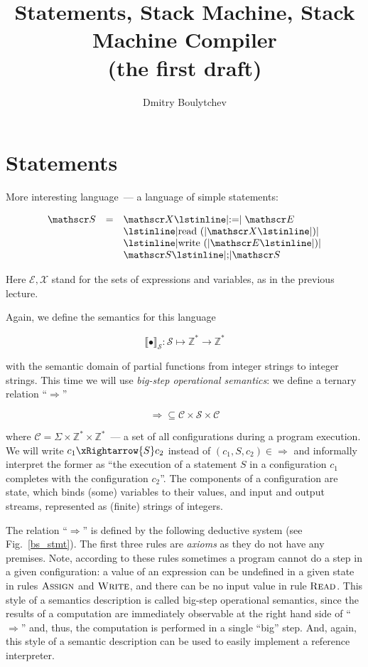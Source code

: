 \documentclass{article}
\title{Statements, Stack Machine, Stack Machine Compiler\\
  (the first draft)
}
\date{\vspace{-5ex}}
\author{Dmitry Boulytchev}
\newcommand{\rulename}[1]{\textsc{#1}}
\newcommand{\sembr}[1]{\llbracket{#1}\rrbracket}
\theoremstyle{definition}
\begin{document}
\maketitle

\section{Statements}

More interesting language~--- a language of simple statements:

$$
\begin{array}{rcl}  
  \mathscr S & = & \mathscr X \mbox{\lstinline|:=|} \;\mathscr E \\
             &   & \mbox{\lstinline|read (|} \mathscr X \mbox{\lstinline|)|} \\
             &   & \mbox{\lstinline|write (|} \mathscr E \mbox{\lstinline|)|} \\
             &   & \mathscr S \mbox{\lstinline|;|} \mathscr S
\end{array}
$$

Here $\mathscr E, \mathscr X$ stand for the sets of expressions and variables, as in the previous lecture.

Again, we define the semantics for this language 

$$
\sembr{\bullet}_{\mathscr S} : \mathscr S \mapsto \mathbb Z^* \to \mathbb Z^*
$$

with the semantic domain of partial functions from integer strings to integer strings. This time we will
use \emph{big-step operational semantics}: we define a ternary relation ``$\Rightarrow$''

$$
\Rightarrow \subseteq \mathscr C \times \mathscr S \times \mathscr C
$$

where $\mathscr C = \Sigma \times \mathbb Z^* \times \mathbb Z^*$~--- a set of all configurations during a
program execution. We will write $c_1\xRightarrow{S}c_2$ instead of $(c_1, S, c_2)\in\Rightarrow$ and informally
interpret the former as ``the execution of a statement $S$ in a configuration $c_1$ completes with the configuration
$c_2$''. The components of a configuration are state, which binds (some) variables to their values, and input and
output streams, represented as (finite) strings of integers.

The relation ``$\Rightarrow$'' is defined by the following deductive system (see Fig.~\ref{bs_stmt}). The first
three rules are \emph{axioms} as they do not have any premises. Note, according to these rules sometimes a program
cannot do a step in a given configuration: a value of an expression can be undefined in a given state in rules
$\rulename{Assign}$ and $\rulename{Write}$, and there can be no input value in rule $\rulename{Read}$. This style of
a semantics description is called big-step operational semantics, since the results of a computation are
immediately observable at the right hand side of ``$\Rightarrow$'' and, thus, the computation is performed in
a single ``big'' step. And, again, this style of a semantic description can be used to easily implement a
reference interpreter.
\end{document}
